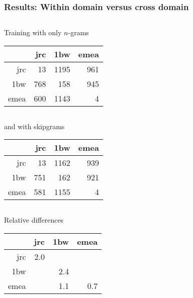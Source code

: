 \documentclass[11pt,t]{beamer}
\newcounter{acolumn}%
\begin{document}
\begin{frame}
    \frametitle{Results: Within domain versus cross domain}

    {\small
    \begin{acolumns}[T,totalwidth=\textwidth]
        \begin{column}{0.5\textwidth}
        \begin{block}{Training with only $n$-grams}
            \begin{tabular}{rrrr}
                    & jrc & 1bw  & emea \\ \hline
                jrc & 13  & 1195 & 961 \\
                1bw & 768 & 158  & 945 \\
                emea& 600 & 1143 & 4
            \end{tabular}
        \end{block}
        \end{column}
        \begin{column}{0.5\textwidth}
        \begin{block}{and with skipgrams}
            \begin{tabular}{rrrr}
                    & jrc & 1bw  & emea \\ \hline
                jrc & 13  & 1162 & 939 \\
                1bw & 751 & 162  & 921 \\
                emea& 581 & 1155 & 4
            \end{tabular}
        \end{block}
        \end{column}
    \end{acolumns}

        \begin{block}{Relative differences}
            \begin{tabular}{rrrr}
                    & jrc  & 1bw  & emea \\ \hline
                jrc & 2.0  & \cellcolor{green!25}{-2.8} & \cellcolor{green!25}{-2.3} \\
                1bw & \cellcolor{green!25}{-2.2} & 2.4  & \cellcolor{green!25}{-2.6} \\
                emea& \cellcolor{green!25}{-3.2} & 1.1  & 0.7
            \end{tabular}
        \end{block}
    }
\end{frame}
\end{document}
